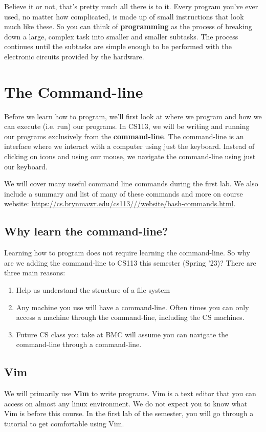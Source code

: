 Believe it or not, that's pretty much all there is to it.
Every program you've ever used, no matter how complicated, is made up of small instructions that look much like these.
So you can think of {\bf programming} as the process of breaking down a large, complex task into smaller and smaller subtasks.
The process continues until the subtasks are simple enough to be performed with the electronic circuits provided by the hardware.

\section{The Command-line}
\label{cmd-line}

Before we learn how to program, we'll first look at where we program and how we can execute (i.e. run)
our programs.
In CS113, we will be writing and running our programs exclusively from the {\bf command-line}. The command-line is an interface where we interact with a computer using just the keyboard. Instead of clicking on
icons and using our mouse, we navigate the command-line using just our keyboard.

We will cover many useful command line commands during the first lab. We also
include a summary and list of many of these commands and more on
course website: \url{https://cs.brynmawr.edu/cs113///website/bash-commands.html}.

\subsection{Why learn the command-line?}
Learning how to program does not require learning the command-line. 
So why are we adding the
command-line to CS113 this semester (Spring '23)? There are three main reasons:

\begin{enumerate}
\item Help us understand the structure of a file system
\item Any machine you use will have a command-line. Often times you can only access a machine
through the command-line, including the CS machines.
\item Future CS class you take at BMC will assume you can navigate the command-line
through a command-line.

\end{enumerate}

\subsection{Vim}
We will primarily use {\bf Vim} to write programs. Vim is a text editor
that you can access on almost any linux environment. We do not expect you to know what Vim is before
this course. In the first lab of the semester, you will go through a tutorial to get
comfortable using Vim. 

